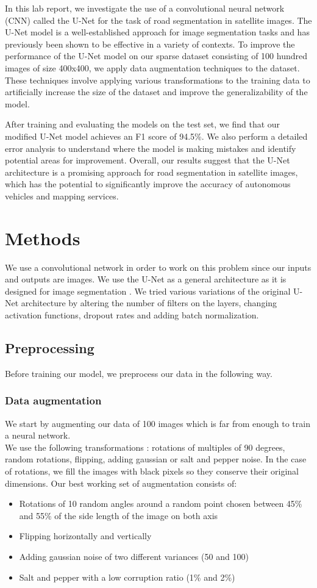 \documentclass[10pt,conference,compsocconf]{IEEEtran}
\begin{document}
In this lab report, we investigate the use of a convolutional neural network (CNN) called the U-Net for the task of road segmentation in satellite images. The U-Net model is a well-established approach for image segmentation tasks and has previously been shown to be effective in a variety of contexts. To improve the performance of the U-Net model on our sparse dataset consisting of 100 hundred images of size 400x400, we apply data augmentation techniques to the dataset. These techniques involve applying various transformations to the training data to artificially increase the size of the dataset and improve the generalizability of the model.

After training and evaluating the models on the test set, we find that our modified U-Net model achieves an F1 score of 94.5\%. We also perform a detailed error analysis to understand where the model is making mistakes and identify potential areas for improvement. Overall, our results suggest that the U-Net architecture is a promising approach for road segmentation in satellite images, which has the potential to significantly improve the accuracy of autonomous vehicles and mapping services.

\section{Methods}
We use a convolutional network in order to work on this problem since our inputs and outputs are images. We use the U-Net as a general architecture as it is designed for image segmentation \cite{wiki:u-net}. We tried various variations of the original U-Net architecture by altering the number of filters on the layers, changing activation functions, dropout rates and adding batch normalization.
\subsection{Preprocessing}
\label{preprocess}
Before training our model, we preprocess our data in the following way.
\subsubsection{Data augmentation}
We start by augmenting our data of 100 images which is far from enough to train a neural network.\\
We use the following transformations : rotations of multiples of 90 degrees, random rotations, flipping, adding gaussian or salt and pepper noise. In the case of rotations, we fill the images with black pixels so they conserve their original dimensions. Our best working set of augmentation consists of:
\begin{itemize}
\item Rotations of 10 random angles around a random point chosen between 45\% and 55\% of the side length of the image on both axis
\item Flipping horizontally and vertically
\item Adding gaussian noise of two different variances (50 and 100)
\item Salt and pepper with a low corruption ratio (1\% and 2\%)
\end{itemize}
\end{document}
